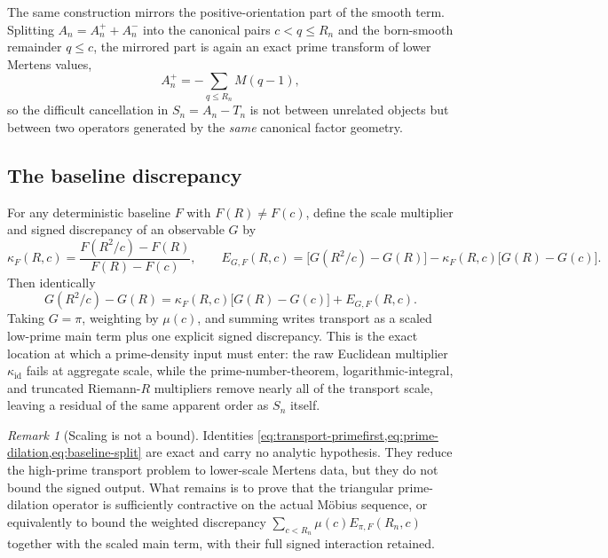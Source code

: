 \documentclass[11pt]{article}
\theoremstyle{definition}
\theoremstyle{remark}
\newtheorem{remark}[theorem]{Remark}
\newcommand{\1}{\mathbf{1}}
\begin{document}
The same construction mirrors the positive-orientation part of the smooth term.  Splitting $A_n=A_n^++A_n^-$ into the canonical pairs $c<q\le R_n$ and the born-smooth remainder $q\le c$, the mirrored part is again an exact prime transform of lower Mertens values,
\begin{equation}
 A_n^+=-\sum_{q\le R_n}M(q-1),
 \label{eq:A-plus-primeform}
\end{equation}
so the difficult cancellation in $S_n=A_n-T_n$ is not between unrelated objects but between two operators generated by the \emph{same} canonical factor geometry.

\subsection{The baseline discrepancy}

For any deterministic baseline $F$ with $F(R)\ne F(c)$, define the scale multiplier and signed discrepancy of an observable $G$ by
\begin{equation}
 \kappa_F(R,c)=\frac{F(R^2/c)-F(R)}{F(R)-F(c)},
 \qquad
 E_{G,F}(R,c)=\bigl[G(R^2/c)-G(R)\bigr]-\kappa_F(R,c)\bigl[G(R)-G(c)\bigr].
 \label{eq:baseline-discrepancy}
\end{equation}
Then identically
\begin{equation}
 G(R^2/c)-G(R)=\kappa_F(R,c)\bigl[G(R)-G(c)\bigr]+E_{G,F}(R,c).
 \label{eq:baseline-split}
\end{equation}
Taking $G=\pi$, weighting by $\mu(c)$, and summing writes transport as a scaled low-prime main term plus one explicit signed discrepancy.  This is the exact location at which a prime-density input must enter: the raw Euclidean multiplier $\kappa_{\mathrm{id}}$ fails at aggregate scale, while the prime-number-theorem, logarithmic-integral, and truncated Riemann-$R$ multipliers remove nearly all of the transport scale, leaving a residual of the same apparent order as $S_n$ itself.

\begin{remark}[Scaling is not a bound]
\label{rem:scaling-not-bound}
Identities \cref{eq:transport-primefirst,eq:prime-dilation,eq:baseline-split} are exact and carry no analytic hypothesis.  They reduce the high-prime transport problem to lower-scale Mertens data, but they do not bound the signed output.  What remains is to prove that the triangular prime-dilation operator is sufficiently contractive on the actual M\"obius sequence, or equivalently to bound the weighted discrepancy $\sum_{c<R_n}\mu(c)E_{\pi,F}(R_n,c)$ together with the scaled main term, with their full signed interaction retained.
\end{remark}
\end{document}
